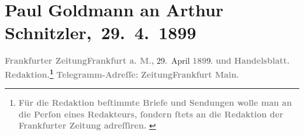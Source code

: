

         
         \renewcommand{\erwaehntePersonen}{Personen: Alfred Dreyfus, Paul Goldmann, Fedor Mamroth, Josef Rosengart, Vally Rosengart}
         \renewcommand{\erwaehnteInstitutionen}{Institutionen: Frankfurter Zeitung}
         \renewcommand{\erwaehnteOrte}{Orte: Berlin, Deutsches Theater Berlin, Frankfurt am Main, Wien}
         \renewcommand{\erwaehnteWerke}{Werke: Der grüne Kakadu – Paracelsus – Die Gefährtin. Drei Einakter}
               \section[ Paul Goldmann an Arthur Schnitzler, 29. 4. 1899]{ Paul Goldmann an Arthur Schnitzler, 29. 4. 1899}\nopagebreak{}\rehead{ }\begin{ledgroupsized}[t]{13cm}\normalsize\beginnumbering{} \toendnotes[C]{\smallbreak\pagebreak[2]} 
\toendnotes[C]{\smallbreak}\pstart
           \noindent{}{\pb}\textcolor{gray}{\textbf{\textbf{Frankfurter Zeitung}}}\hfill \textcolor{gray}{\textbf{\textbf{Frankfurt a. M.,}}}{ }29. April \textcolor{gray}{\textbf{189}}9.\pend
           \pstart
           \textcolor{gray}{\textbf{und}}\pend
           \pstart
           \textcolor{gray}{\textbf{Handelsblatt.}}\pend
           \pstart
           \textcolor{gray}{\textbf{\textbf{Redaktion.}\footnote{\noindent{}\textcolor{gray}{\textbf{Für die Redaktion beſtimmte Briefe und Sendungen wolle man
                                  an die Perſon eines Redakteurs,
                              ſondern ſtets \textbf{an die Redaktion der Frankfurter Zeitung} adreſſiren. }}}}}\pend
           \pstart
           \textcolor{gray}{\textbf{Telegramm-Adreſſe:}}\pend
           \pstart
           \textcolor{gray}{\textbf{\textbf{ZeitungFrankfurt Main.}}}\pend

\end{ledgroupsized}
